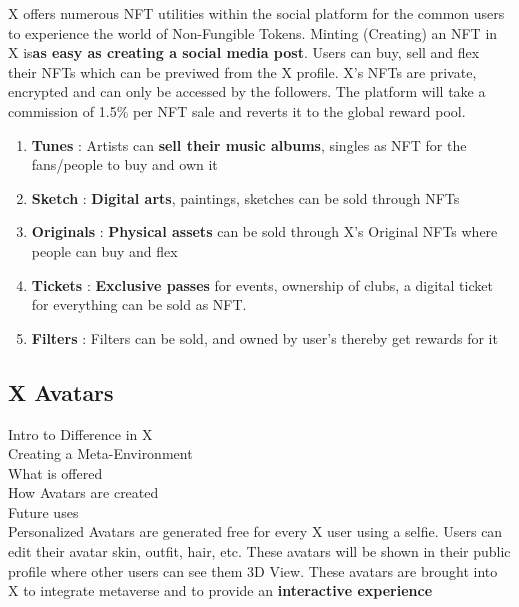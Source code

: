 \documentclass[letterpaper,11pt]{article}
\begin{document}
\begin{enumerate}[wide, labelwidth=!, labelindent=0pt]
X offers numerous NFT utilities within the social platform for the common users to experience the world of Non-Fungible Tokens. Minting (Creating) an NFT in X is\textbf{as easy as creating a social media post}. Users can buy, sell and flex their NFTs which can be previwed from the X profile. X's NFTs are private, encrypted and can only be accessed by the followers. The platform will take a commission of 1.5\% per NFT sale and reverts it to the global reward pool.
\begin{enumerate}[wide, labelwidth=!, labelindent=0pt]
\item \textbf{Tunes} : Artists can \textbf{sell their music albums}, singles as NFT for the fans/people to buy and own it

\item \textbf{Sketch} : \textbf{Digital arts}, paintings, sketches can be sold through NFTs

\item \textbf{Originals} : \textbf{Physical assets} can be sold through X's Original NFTs where people can buy and flex

\item \textbf{Tickets} : \textbf{Exclusive passes} for events, ownership of clubs, a digital ticket for everything can be sold as NFT. 

\item \textbf{Filters} : Filters can be sold, and owned by user's thereby get rewards for it
\end{enumerate}
\end{enumerate}

\subsection{\textbf{X Avatars}}

Intro to Difference in X\\

Creating a Meta-Environment\\

What is offered\\

How Avatars are created\\

Future uses\\

Personalized Avatars are generated free for every X user using a selfie. Users can edit their avatar skin, outfit, hair, etc. These avatars will be shown in their public profile where other users can see them 3D View. These avatars are brought into X to integrate metaverse and to provide an \textbf{interactive experience}\\
\end{document}
